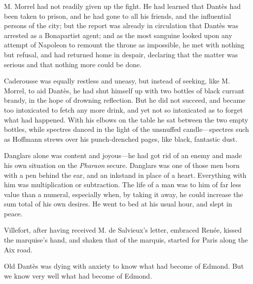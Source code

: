  M. Morrel had not readily given up the fight. He had learned that Dantès had been taken to prison, and he had gone to all his friends, and the influential persons of the city; but the report was already in circulation that Dantès was arrested as a Bonapartist agent; and as the most sanguine looked upon any attempt of Napoleon to remount the throne as impossible, he met with nothing but refusal, and had returned home in despair, declaring that the matter was serious and that nothing more could be done. 

 Caderousse was equally restless and uneasy, but instead of seeking, like M. Morrel, to aid Dantès, he had shut himself up with two bottles of black currant brandy, in the hope of drowning reflection. But he did not succeed, and became too intoxicated to fetch any more drink, and yet not so intoxicated as to forget what had happened. With his elbows on the table he sat between the two empty bottles, while spectres danced in the light of the unsnuffed candle—spectres such as Hoffmann strews over his punch-drenched pages, like black, fantastic dust. 

 Danglars alone was content and joyous—he had got rid of an enemy and made his own situation on the \textit{Pharaon} secure. Danglars was one of those men born with a pen behind the ear, and an inkstand in place of a heart. Everything with him was multiplication or subtraction. The life of a man was to him of far less value than a numeral, especially when, by taking it away, he could increase the sum total of his own desires. He went to bed at his usual hour, and slept in peace. 

 Villefort, after having received M. de Salvieux's letter, embraced Renée, kissed the marquise's hand, and shaken that of the marquis, started for Paris along the Aix road. 

 Old Dantès was dying with anxiety to know what had become of Edmond. But we know very well what had become of Edmond. 